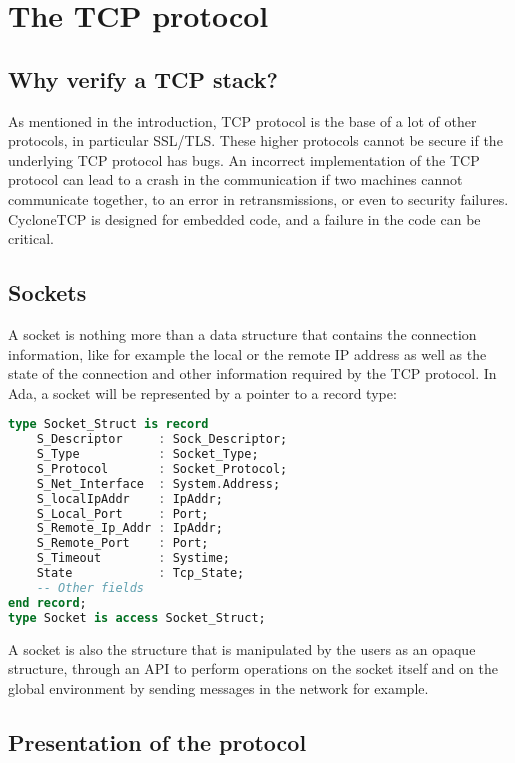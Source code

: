 \documentclass[a4paper, 10pt]{article}
\begin{document}
    \section{The TCP protocol}

    \subsection{Why verify a TCP stack?}

    As mentioned in the introduction, TCP protocol is the base of a lot of other protocols,
    in particular SSL/TLS. These higher protocols cannot be secure if the underlying TCP protocol
    has bugs. An incorrect implementation of the TCP protocol can lead to a crash
    in the communication if two machines cannot communicate together, to an error in
    retransmissions, or even to security failures. CycloneTCP is designed for embedded
    code, and a failure in the code can be critical.


    \subsection{Sockets}

    A socket is nothing more than a data structure that contains the connection
    information, like for example the local or the remote IP address as well as
    the state of the connection and other information required by the TCP protocol.
    In Ada, a socket will be represented by a pointer to a record type:

    \begin{lstlisting}[language=Ada]
type Socket_Struct is record
    S_Descriptor     : Sock_Descriptor;
    S_Type           : Socket_Type;
    S_Protocol       : Socket_Protocol;
    S_Net_Interface  : System.Address;
    S_localIpAddr    : IpAddr;
    S_Local_Port     : Port;
    S_Remote_Ip_Addr : IpAddr;
    S_Remote_Port    : Port;
    S_Timeout        : Systime;
    State            : Tcp_State;
    -- Other fields
end record;
type Socket is access Socket_Struct;
    \end{lstlisting}

    A socket is also the structure that is manipulated by the users as an opaque structure,
    through an API to perform operations on the socket itself and on the
    global environment by sending messages in the network for example.

    \subsection{Presentation of the protocol}
\end{document}
